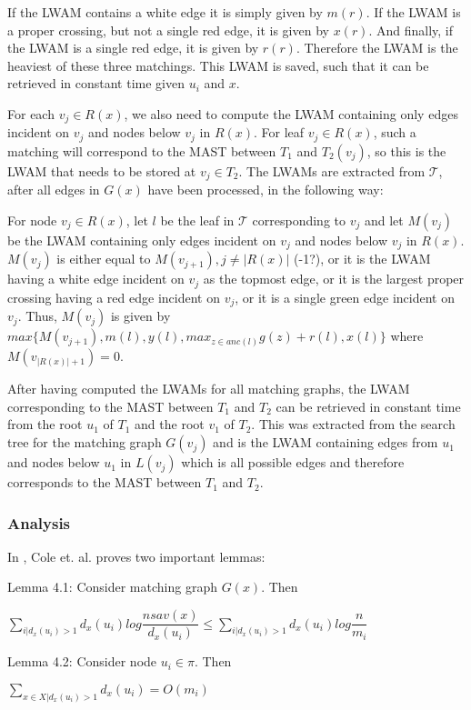 If the LWAM contains a white edge it is simply given by $m(r)$. If the LWAM is a proper crossing, but not a single red edge, it is given by $x(r)$. And finally, if the LWAM is a single red edge, it is given by $r(r)$. Therefore the LWAM is the heaviest of these three matchings. This LWAM is saved, such that it can be retrieved in constant time given $u_i$ and $x$. 

For each $v_j \in R(x)$, we also need to compute the LWAM containing only edges incident on $v_j$ and nodes below $v_j$ in $R(x)$. For leaf $v_j \in R(x)$, such a matching will correspond to the MAST between $T_1$ and $T_2(v_j)$, so this is the LWAM that needs to be stored at $v_j \in T_2$. The LWAMs are extracted from $\mathcal{T}$, after all edges in $G(x)$ have been processed, in the following way:

For node $v_j \in R(x)$, let $l$ be the leaf in $\mathcal{T}$ corresponding to $v_j$ and let $M(v_j)$ be the LWAM containing only edges incident on $v_j$ and nodes below $v_j$ in $R(x)$. $M(v_j)$ is either equal to $M(v_{j+1}), j \ne |R(x)|$ (-1?), or it is the LWAM having a white edge incident on $v_j$ as the topmost edge, or it is the largest proper crossing having a red edge incident on $v_j$, or it is a single green edge incident on $v_j$. Thus, $M(v_j)$ is given by $max\{M(v_{j+1}), m(l), y(l), max_{z \in anc(l)}g(z) + r(l), x(l)\}$ where $M(v_{|R(x)|+1}) = 0$.

After having computed the LWAMs for all matching graphs, the LWAM corresponding to the MAST between $T_1$ and $T_2$ can be retrieved in constant time from the root $u_1$ of $T_1$ and the root $v_1$ of $T_2$. This was extracted from the search tree for the matching graph $G(v_j)$ and is the LWAM containing edges from $u_1$ and nodes below $u_1$ in $L(v_j)$ which is all possible edges and therefore corresponds to the MAST between $T_1$ and $T_2$.

\subsubsection{Analysis}
\label{lwam_analysis}
In \cite{nlogn}, Cole et. al. proves two important lemmas:

Lemma 4.1: Consider matching graph $G(x)$. Then

$\sum_{i|d_x(u_i)>1} d_x(u_i)log\dfrac{nsav(x)}{d_x(u_i)} \le \sum_{i|d_x(u_i)>1} d_x(u_i)log\dfrac{n}{m_i}$

Lemma 4.2: Consider node $u_i \in \pi$. Then

$\sum_{x \in X | d_x(u_i)>1} d_x(u_i) = O(m_i)$

